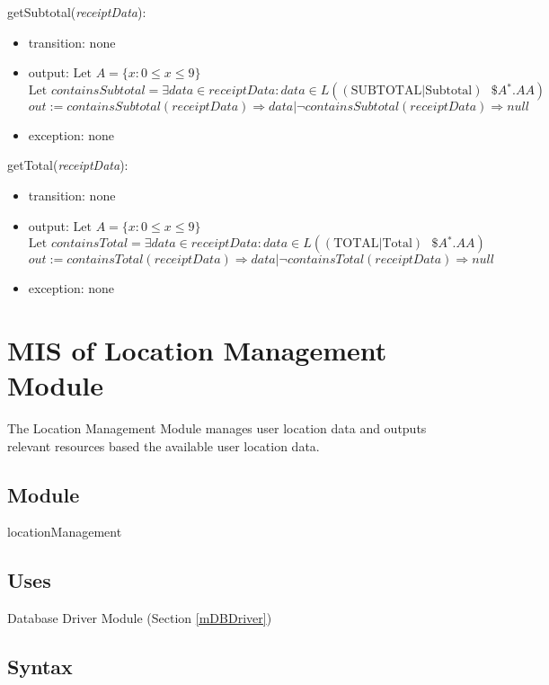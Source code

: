 \documentclass[12pt, titlepage]{article}
\begin{document}
\noindent getSubtotal(\textit{receiptData}):
\begin{itemize}
  \item transition: none
  \item output: $\text{Let } A=\{x : 0 \leq x \leq 9\}$ \\
                $\text{Let } containsSubtotal=\exists data \in receiptData : data \in L((\text{SUBTOTAL}|\text{Subtotal})\text{ }\$A{}^\ast.AA)$ \\
                $out := containsSubtotal(receiptData) \Rightarrow data | \neg containsSubtotal(receiptData) \Rightarrow null$
  \item exception: none
\end{itemize}

\noindent getTotal(\textit{receiptData}):
\begin{itemize}
  \item transition: none
  \item output: $\text{Let } A=\{x : 0 \leq x \leq 9\}$ \\
                $\text{Let } containsTotal=\exists data \in receiptData : data \in L((\text{TOTAL}|\text{Total})\text{ }\$A{}^\ast.AA)$ \\
                $out := containsTotal(receiptData) \Rightarrow data | \neg containsTotal(receiptData) \Rightarrow null$
  \item exception: none
\end{itemize}

\newpage

\section{MIS of Location Management Module} \label{mLocation} 
The Location Management Module manages user location data and outputs relevant resources based the available user location data.

\subsection{Module}

locationManagement

\subsection{Uses}

Database Driver Module (Section \ref{mDBDriver})

\subsection{Syntax}
\end{document}
